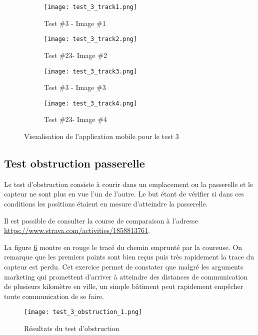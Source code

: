 \begin{figure}[tb]
\centering
\begin{subfigure}{0.7\textwidth}
  \centering
  \texttt{[image: test\_3\_track1.png]}
  \caption{Test \#3 - Image \#1}
  \label{fig:test_3_track1}
\end{subfigure}%

\begin{subfigure}{0.7\textwidth}
  \centering
  \texttt{[image: test\_3\_track2.png]}
  \caption{Test \#23- Image \#2}
  \label{fig:test_3_track2}
\end{subfigure}

\begin{subfigure}{0.7\textwidth}
  \centering
  \texttt{[image: test\_3\_track3.png]}
  \caption{Test \#3 - Image \#3}
  \label{fig:test_3_track3}
\end{subfigure}%

\begin{subfigure}{0.7\textwidth}
  \centering
  \texttt{[image: test\_3\_track4.png]}
  \caption{Test \#23- Image \#4}
  \label{fig:test_3_track4}
\end{subfigure}
\caption{Visualisation de l'application mobile pour le test 3}
\label{fig:test_3}
\end{figure}

\subsection{Test obstruction passerelle}

Le test d'obstruction consiste à courir dans un emplacement ou la passerelle et le capteur ne sont plus en vue l'un de l'autre. Le but étant de vérifier si dans ces conditions les positions étaient en mesure d'atteindre la passerelle.

Il est possible de consulter la course de comparaison à l'adresse \url{https://www.strava.com/activities/1858813761}.

La figure \ref{fig:test_3_obstru} montre en rouge le tracé du chemin emprunté par la coureuse. On remarque que les premiers points sont bien reçus puis très rapidement la trace du capteur est perdu. Cet exercice permet de constater que malgré les arguments marketing qui promettent d'arriver à atteindre des distances de communication de plusieurs kilomètre en ville, un simple bâtiment peut rapidement empêcher toute communication de se faire.

\begin{figure}[htb]
\centering 
\texttt{[image: test\_3\_obstruction\_1.png]} 
\caption{Résultats du test d'obstruction}
\label{fig:test_3_obstru}
\end{figure}

